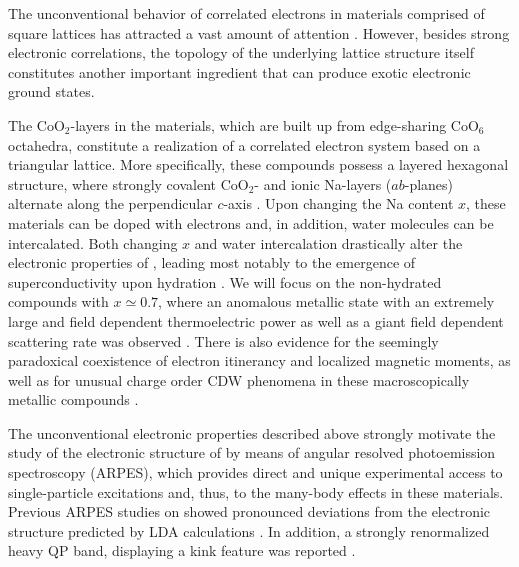 \documentclass[preprint,showpacs,preprintnumbers,amsmath,amssymb,twoside,aps]{revtex4}
\begin{document}
%
\maketitle



The unconventional behavior of correlated electrons in materials comprised of square lattices has attracted a vast amount of attention
\cite{OrensteinScience00,TokuraScience00}. However, besides strong electronic correlations, the topology of the underlying lattice structure itself
constitutes another important ingredient that can produce exotic electronic ground states.

The CoO$_2$-layers in the \NCOx\/ materials, which are built up from edge-sharing CoO$_6$ octahedra, constitute a realization of a correlated
electron system based on a triangular lattice. More specifically, these compounds possess a layered hexagonal structure, where strongly covalent
CoO$_2$- and ionic Na-layers ($ab$-planes) alternate along the perpendicular $c$-axis \cite{HuangPRB04a}. Upon changing the Na content $x$, these
materials can be doped with electrons and, in addition, water molecules can be intercalated. Both changing $x$ and water intercalation drastically
alter the electronic properties of \NCOx, leading most notably to the emergence of superconductivity upon hydration \cite{FooPRL04,TakadaNature03}.
%
We will focus on the non-hydrated compounds with $x\simeq0.7$, where an anomalous metallic state with an extremely large and field dependent
thermoelectric power as well as a giant field dependent scattering rate was observed \cite{WangNature03,LiPRL04}. There is also evidence for the
seemingly paradoxical coexistence of electron itinerancy and localized magnetic moments, as well as for unusual charge order CDW phenomena in these
macroscopically metallic compounds \cite{GavilanoPRB04,BernhardPRL04,NingPRL04}.


%
The unconventional electronic properties described above strongly motivate the study of the electronic structure of \NCOx\/ by means of angular
resolved photoemission spectroscopy (ARPES), which provides direct and unique experimental access to single-particle excitations and, thus, to the
many-body effects in these materials. Previous ARPES studies on \NCOx\/ \cite{VallaNature02,YangPRL04,HasanPRL04,YangPRL05,QianPRL06,QianPRL06b}
showed pronounced deviations from the electronic structure predicted by LDA
calculations \cite{SinghPRB00}. %
In addition, a strongly renormalized heavy QP band, displaying a  kink feature was reported \cite{YangPRL04,HasanPRL04,YangPRL05}.
\end{document}
